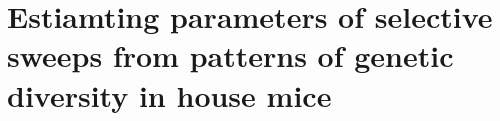 \chapter{Estiamting parameters of selective sweeps from patterns of genetic diversity in house mice}
